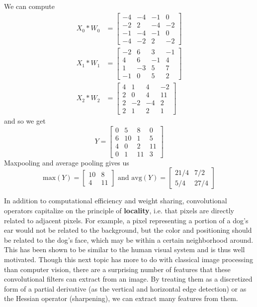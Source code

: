\documentclass{article}
\begin{document}
    \begin{solution}
    We can compute 
    \begin{align*} 
        X_0 \ast  W_0 & = \begin{bmatrix} -4 & -4 & -1 & 0 \\ -2 & 2 & -4 & -2 \\ -1 & -4 & -1 & 0 \\ -4 & -2 & 2 & -2 \end{bmatrix} \\
        X_1 \ast W_1 & = \begin{bmatrix} -2 & 6 & 3 & -1 \\ 4 & 6 & -1 & 4 \\ 1 & -3 & 5 & 7 \\ -1 & 0 & 5 & 2 \end{bmatrix} \\
        X_2 \ast W_2 & = \begin{bmatrix} 4 & 1 & 4 & -2 \\ 2 & 0 & 4 & 11 \\ 2 & -2 & -4 & 2 \\ 2 & 1 & 2 & 1 \end{bmatrix}
    \end{align*}
    and so we get 
    \[Y = \begin{bmatrix} 0 & 5 & 8 & 0 \\ 6 & 10 & 1 & 5 \\ 4 &  0 & 2 & 11 \\ 0 & 1 & 11 & 3 \end{bmatrix}\]
    Maxpooling and average pooling gives us 
    \[\mathrm{max}(Y) = \begin{bmatrix} 10 & 8 \\ 4 & 11 \end{bmatrix} \text{ and } \mathrm{avg}(Y) = \begin{bmatrix} 21/4 & 7/2 \\ 5/4 & 27/4 \end{bmatrix}\]
    \end{solution}

    In addition to computational efficiency and weight sharing, convolutional operators capitalize on the principle of \textbf{locality}, i.e. that pixels are directly related to adjacent pixels. For example, a pixel representing a portion of a dog's ear would not be related to the background, but the color and positioning should be related to the dog's face, which may be within a certain neighborhood around. This has been shown to be similar to the human visual system and is thus well motivated. Though this next topic has more to do with classical image processing than computer vision, there are a surprising number of features that these convolutional filters can extract from an image. By treating them as a discretized form of a partial derivative (as the vertical and horizontal edge detection) or as the Hessian operator (sharpening), we can extract many features from them.  
\end{document}
